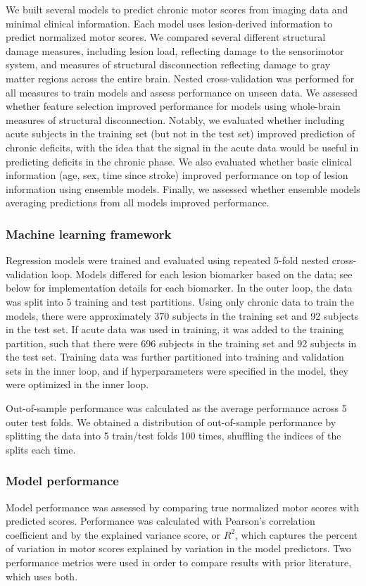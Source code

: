 \documentclass[10pt]{article}
\begin{document}
We built several models to predict chronic motor scores from imaging data and minimal clinical information. Each model uses lesion-derived information to predict normalized motor scores. We compared several different structural damage measures, including lesion load, reflecting damage to the sensorimotor system, and measures of structural disconnection reflecting damage to gray matter regions across the entire brain. Nested cross-validation was performed for all measures to train models and assess performance on unseen data. We assessed whether feature selection improved performance for models using whole-brain measures of structural disconnection. Notably, we evaluated whether including acute subjects in the training set (but not in the test set) improved prediction of chronic deficits, with the idea that the signal in the acute data would be useful in predicting deficits in the chronic phase. We also evaluated whether basic clinical information (age, sex, time since stroke) improved performance on top of lesion information using ensemble models. Finally, we assessed whether ensemble models averaging predictions from all models improved performance. 

\subsubsection*{Machine learning framework}
Regression models were trained and evaluated using repeated 5-fold nested cross-validation loop. Models differed for each lesion biomarker based on the data; see below for implementation details for each biomarker. In the outer loop, the data was split into 5 training and test partitions. Using only chronic data to train the models, there were approximately 370 subjects in the training set and 92 subjects in the test set. If acute data was used in training, it was added to the training partition, such that there were 696 subjects in the training set and 92 subjects in the test set. Training data was further partitioned into training and validation sets in the inner loop, and if hyperparameters were specified in the model, they were optimized in the inner loop. 

Out-of-sample performance was calculated as the average performance across 5 outer test folds. We obtained a distribution of out-of-sample performance by splitting the data into 5 train/test folds 100 times, shuffling the indices of the splits each time. 

\subsubsection*{Model performance}
Model performance was assessed by comparing true normalized motor scores with predicted scores. Performance was calculated with Pearson's correlation coefficient and by the explained variance score, or $R^2$, which captures the percent of variation in motor scores explained by variation in the model predictors. Two performance metrics were used in order to compare results with prior literature, which uses both.
\end{document}
